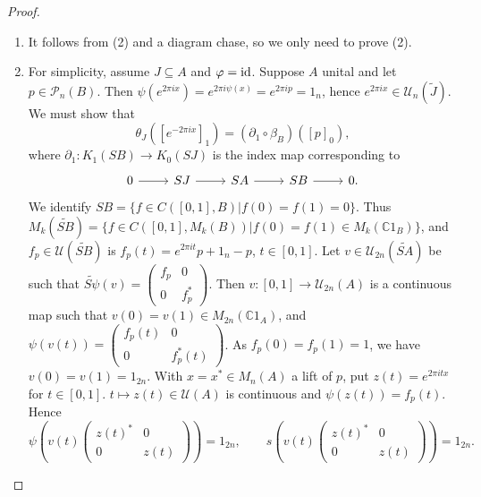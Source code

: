 \documentclass{book}
\begin{document}
\begin{proof}
  \begin{enumerate}
    \item It follows from (2) and a diagram chase, so we only need to prove (2).
    \item For simplicity, assume \(J\subseteq A\) and \(\varphi=\textnormal{id}\). Suppose \(A\) unital and let \(p\in\mathcal{P}_n(B)\).
    Then \(\psi(e^{2\pi ix})=e^{2\pi i\psi(x)}=e^{2\pi ip}=1_n\), hence \(e^{2\pi ix}\in\mathcal{U}_n(\tilde{J})\). We must show that
    \begin{equation}\label{eq:8314}
      \theta_J({[e^{-2\pi ix}]}_1)=(\partial_1\circ \beta_B)({[p]}_0),
    \end{equation}
    where \(\partial_1:K_1(S B)\rightarrow K_0(S J)\) is the index map corresponding to 
    \[
      \begin{tikzcd}
        0\arrow[r]&S J\arrow[r]&S A\arrow[r]&S B\arrow[r]&0.
      \end{tikzcd}
    \]
    We identify \(S B=\{f\in C([0,1],B)| f(0)=f(1)=0\}\). Thus \(M_k(\widetilde{S B})=\{f\in C([0,1],M_k(B))| f(0)=f(1)\in M_k(\mathbb{C}1_B)\}\),
    and \(f_p\in\mathcal{U}(\widetilde{S B})\) is \(f_p(t)=e^{2\pi it}p+1_n-p\), \(t\in[0,1]\).
    Let \(v\in\mathcal{U}_{2n}(\widetilde{S A})\) be such that \(\widetilde{S\psi}(v)=\begin{pmatrix}
      f_p&0\\0&f^*_p
    \end{pmatrix}\). Then \(v:[0,1]\rightarrow\mathcal{U}_{2n}(A)\) is a continuous map such that
    \(v(0)=v(1)\in M_{2n}(\mathbb{C}1_A)\), and \(\psi(v(t))=\begin{pmatrix}
      f_p(t)&0\\0&f_p^*(t)
    \end{pmatrix}\).
    As \(f_p(0)=f_p(1)=1\), we have \(v(0)=v(1)=1_{2n}\). With \(x=x^*\in M_n(A)\) a lift of \(p\), put \(z(t)=e^{2\pi itx}\)
    for \(t\in[0,1]\). \(t\mapsto z(t)\in\mathcal{U}(A)\) is continuous and \(\psi(z(t))=f_p(t)\). Hence
    \begin{equation}
      \psi\left(v(t)\begin{pmatrix}
        {z(t)}^*&0\\0&z(t)
      \end{pmatrix}\right)=1_{2n},\qquad
      s\left(v(t)\begin{pmatrix}
        {z(t)}^*&0\\0&z(t)
      \end{pmatrix}\right)=1_{2n}.
    \end{equation}

\end{enumerate}
\end{proof}
\end{document}

